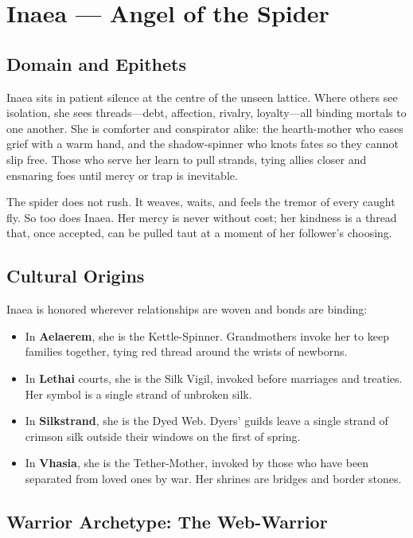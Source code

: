 \section{Inaea — Angel of the Spider}

\subsection{Domain and Epithets}

Inaea sits in patient silence at the centre of the unseen lattice. Where others see isolation, she sees threads—debt, affection, rivalry, loyalty—all binding mortals to one another. She is comforter and conspirator alike: the hearth-mother who eases grief with a warm hand, and the shadow-spinner who knots fates so they cannot slip free. Those who serve her learn to pull strands, tying allies closer and ensnaring foes until mercy or trap is inevitable.

The spider does not rush. It weaves, waits, and feels the tremor of every caught fly. So too does Inaea. Her mercy is never without cost; her kindness is a thread that, once accepted, can be pulled taut at a moment of her follower's choosing.

\subsection{Cultural Origins}

Inaea is honored wherever relationships are woven and bonds are binding:

\begin{itemize}
\item In \textbf{Aelaerem}, she is the Kettle-Spinner. Grandmothers invoke her to keep families together, tying red thread around the wrists of newborns.
\item In \textbf{Lethai} courts, she is the Silk Vigil, invoked before marriages and treaties. Her symbol is a single strand of unbroken silk.
\item In \textbf{Silkstrand}, she is the Dyed Web. Dyers' guilds leave a single strand of crimson silk outside their windows on the first of spring.
\item In \textbf{Vhasia}, she is the Tether-Mother, invoked by those who have been separated from loved ones by war. Her shrines are bridges and border stones.
\end{itemize}

\subsection{Warrior Archetype: The Web-Warrior}

